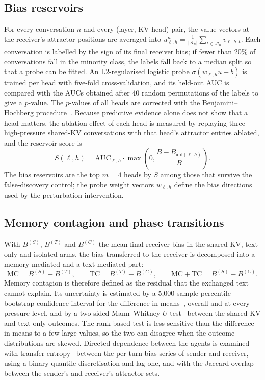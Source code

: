 \subsection{Bias reservoirs}
For every conversation $n$ and every (layer, KV head) pair, the value vectors at the receiver's attractor positions are averaged into $u^n_{\ell,h} = \frac{1}{|\mathcal{A}_n|}\sum_{t\in\mathcal{A}_n} v_{\ell,h,t}$. Each conversation is labelled by the sign of its final receiver bias; if fewer than 20\% of conversations fall in the minority class, the labels fall back to a median split so that a probe can be fitted. An L2-regularised logistic probe $\sigma(w_{\ell,h}^\top u + b)$ is trained per head with five-fold cross-validation, and its held-out AUC is compared with the AUCs obtained after 40 random permutations of the labels to give a $p$-value. The $p$-values of all heads are corrected with the Benjamini--Hochberg procedure~\cite{benjamini1995fdr}. Because predictive evidence alone does not show that a head matters, the ablation effect of each head is measured by replaying three high-pressure shared-KV conversations with that head's attractor entries ablated, and the reservoir score is
\begin{equation}
S(\ell, h) = \mathrm{AUC}_{\ell,h} \cdot \max\!\left(0, \frac{B - B_{\mathrm{abl}(\ell,h)}}{B}\right).
\end{equation}
The bias reservoirs are the top $m = 4$ heads by $S$ among those that survive the false-discovery control; the probe weight vectors $w_{\ell,h}$ define the bias directions used by the perturbation intervention.

\subsection{Memory contagion and phase transitions}
With $B^{(S)}$, $B^{(T)}$ and $B^{(C)}$ the mean final receiver bias in the shared-KV, text-only and isolated arms, the bias transferred to the receiver is decomposed into a memory-mediated and a text-mediated part:
\begin{equation}
\mathrm{MC} = B^{(S)} - B^{(T)}, \qquad \mathrm{TC} = B^{(T)} - B^{(C)}, \qquad \mathrm{MC} + \mathrm{TC} = B^{(S)} - B^{(C)}.
\end{equation}
Memory contagion is therefore defined as the residual that the exchanged text cannot explain. Its uncertainty is estimated by a 5,000-sample percentile bootstrap confidence interval for the difference in means~\cite{efron1993bootstrap}, overall and at every pressure level, and by a two-sided Mann--Whitney $U$ test~\cite{mann1947test} between the shared-KV and text-only outcomes. The rank-based test is less sensitive than the difference in means to a few large values, so the two can disagree when the outcome distributions are skewed. Directed dependence between the agents is examined with transfer entropy~\cite{schreiber2000te} between the per-turn bias series of sender and receiver, using a binary quantile discretisation and lag one, and with the Jaccard overlap between the sender's and receiver's attractor sets.

